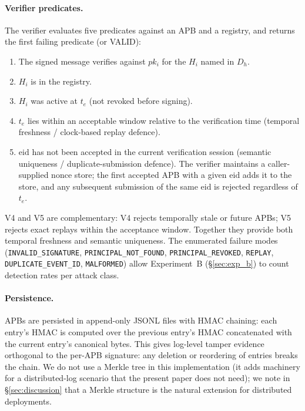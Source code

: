\documentclass[11pt]{article}
\newcommand{\Dh}{D_h}
\newcommand{\Hi}{H_i}
\newcommand{\pki}{pk_i}
\begin{document}
\paragraph{Verifier predicates.}
\label{sec:impl_verifier}%
The verifier evaluates five predicates against an APB and a
registry, and returns the first failing predicate (or VALID):
\begin{enumerate}[leftmargin=2em, topsep=2pt, itemsep=1pt]
  \item[V1.] The signed message verifies against $\pki$ for the
        $\Hi$ named in $\Dh$.
  \item[V2.] $\Hi$ is in the registry.
  \item[V3.] $\Hi$ was active at $t_e$ (not revoked before signing).
  \item[V4.] $t_e$ lies within an acceptable window relative to the
        verification time (temporal freshness / clock-based replay defence).
  \item[V5.] $\mathrm{eid}$ has not been accepted in the current
        verification session (semantic uniqueness / duplicate-submission
        defence). The verifier maintains a caller-supplied nonce store;
        the first accepted APB with a given $\mathrm{eid}$ adds it to
        the store, and any subsequent submission of the same
        $\mathrm{eid}$ is rejected regardless of $t_e$.
\end{enumerate}
V4 and V5 are complementary: V4 rejects temporally stale or future
APBs; V5 rejects exact replays within the acceptance window.
Together they provide both temporal freshness and semantic uniqueness.
The enumerated failure modes (\texttt{INVALID\_SIGNATURE},
\texttt{PRINCIPAL\_NOT\_FOUND}, \texttt{PRINCIPAL\_REVOKED},
\texttt{REPLAY}, \texttt{DUPLICATE\_EVENT\_ID}, \texttt{MALFORMED})
allow Experiment~B (\S\ref{sec:exp_b}) to count detection rates per
attack class.

\paragraph{Persistence.}
\label{sec:impl_log}%
APBs are persisted in append-only JSONL files with HMAC chaining:
each entry's HMAC is computed over the previous entry's HMAC
concatenated with the current entry's canonical bytes. This gives
log-level tamper evidence orthogonal to the per-APB signature: any
deletion or reordering of entries breaks the chain. We do not use a
Merkle tree in this implementation (it adds machinery for a
distributed-log scenario that the present paper does not need); we
note in \S\ref{sec:discussion} that a Merkle structure is the
natural extension for distributed deployments.
\end{document}
